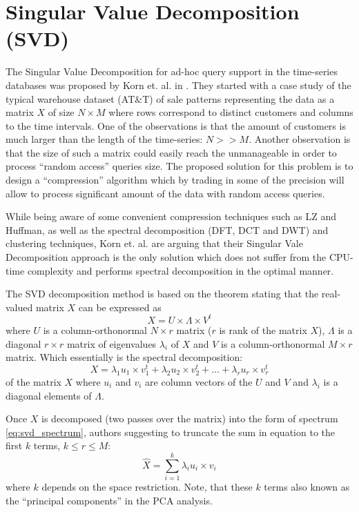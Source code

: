 \section{Singular Value Decomposition (SVD)}
The Singular Value Decomposition for ad-hoc query support in the time-series databases was proposed by Korn et. al. in \cite{citeulike:4373332}. They started with a case study of the typical warehouse dataset (AT\&T) of sale patterns representing the data as a matrix $X$ of size $N \times M$ where rows correspond to distinct customers and columns to the time intervals. One of the observations is that the amount of customers is much larger than the length of the time-series: $N>>M$. Another observation is that the size of such a matrix could easily reach the unmanageable in order to process ``random access'' queries size. The proposed solution for this problem is to design a ``compression'' algorithm which by trading in some of the precision will allow to process significant amount of the data with random access queries. 

While being aware of some convenient compression techniques such as LZ and Huffman, as well as the spectral decomposition (DFT, DCT and DWT) and clustering techniques, Korn et. al. are arguing that their Singular Vale Decomposition approach is the only solution which does not suffer from the CPU-time complexity and performs spectral decomposition in the optimal manner.

The SVD decomposition method is based on the theorem stating that the real-valued matrix $X$ can be expressed as 
\begin{equation}
X = U \times \Lambda \times V^{t}
\label{eq:svd_transform}
\end{equation}
where $U$ is a column-orthonormal $N \times r$ matrix ($r$ is rank of the matrix $X$), $\Lambda$ is a diagonal $r \times r$ matrix of eigenvalues $\lambda_{i}$ of $X$ and $V$ is a column-orthonormal $M \times r$ matrix. Which essentially is the spectral decomposition:
\begin{equation}
X = \lambda_{1} u_{1} \times v_{1}^{t} + \lambda_{2} u_{2} \times v_{2}^{t} + \ldots + \lambda_{r} u_{r} \times v_{r}^{t}
\label{eq:svd_spectrum}
\end{equation}
of the matrix $X$ where $u_{i}$ and $v_{i}$ are column vectors of the $U$ and $V$ and $\lambda_{i}$ is a diagonal elements of $\Lambda$.

Once $X$ is decomposed (two passes over the matrix) into the form of spectrum \ref{eq:svd_spectrum}, authors suggesting to truncate the sum in equation to the first $k$ terms, $k \leq r \leq M$:
\begin{equation}
\hat{X} = \sum_{i=1}^{k} \lambda_{i} u_{i} \times v_{i}
\label{eq:svd}
\end{equation}
where $k$ depends on the space restriction. Note, that these $k$ terms also known as the ``principal components'' in the PCA analysis. 

